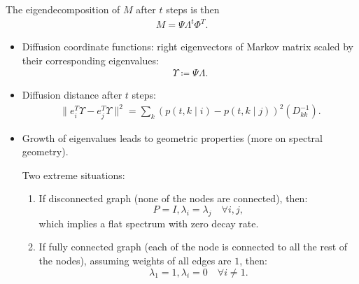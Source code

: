 \begin{enumerate}
    The eigendecomposition of $M$ after $t$ steps is then
    \begin{align}
        M = \Psi \Lambda^t \Phi^T.
    \end{align}
    
    \begin{itemize}
        \item Diffusion coordinate functions: right eigenvectors of Markov matrix scaled by their corresponding eigenvalues: 
        \begin{align}
            \Upsilon \coloneqq \Psi \Lambda.
        \end{align}
        \item Diffusion distance after $t$ steps: 
       \begin{align}
            \| e_i^T  \Upsilon - e_j^T \Upsilon  \|^2 = \sum_{k} (p(t,k\mid i) - p(t,k\mid j))^2 (D_{k k}^{-1}).
       \end{align}
       
       \item Growth of eigenvalues leads to geometric properties (more on spectral geometry).
       
       Two extreme situations:
       \begin{enumerate}
           \item If disconnected graph (none of the nodes are connected), then:
           \[P = I, \lambda_i = \lambda_j \quad \forall i, j, \]
           which implies a flat spectrum with zero decay rate.
           \item If fully connected graph (each of the node is connected to all the rest of the nodes), assuming weights of all edges are $1$, then:
            \[\lambda_1 = 1, \lambda_i = 0 \quad \forall i \neq 1.\]
       \end{enumerate}
    \end{itemize}
\end{enumerate}